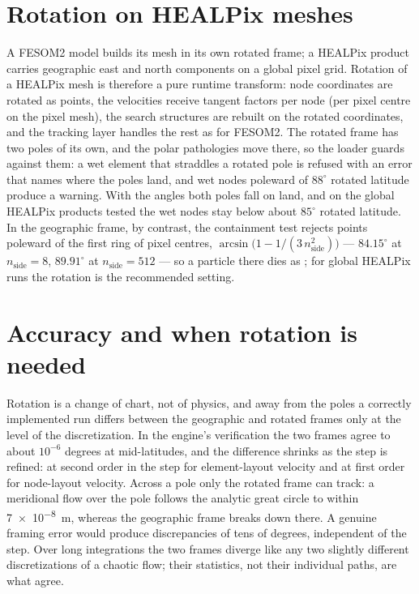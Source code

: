 \section{Rotation on HEALPix meshes}\label{sec:frame-healpix}

A FESOM2 model builds its mesh in its own rotated frame; a HEALPix product carries geographic east and
north components on a global pixel grid. Rotation of a HEALPix mesh is therefore a pure runtime
transform: node coordinates are rotated as points, the velocities receive tangent factors per node (per pixel centre on the pixel mesh), the
search structures are rebuilt on the rotated coordinates, and the tracking layer handles the rest as for
FESOM2. The rotated frame has two poles of its own, and the polar pathologies move there, so the loader
guards against them: a wet element that straddles a rotated pole is refused with an error that names
where the poles land, and wet nodes poleward of $88^\circ$ rotated latitude produce a warning. With the
 angles both poles fall on land, and on the global HEALPix products tested the wet nodes stay
below about $85^\circ$ rotated latitude. In the geographic frame, by contrast, the containment test rejects
points poleward of the first ring of pixel centres, $\arcsin\bigl(1-1/(3\,n_{\text{side}}^2)\bigr)$ ---
$84.15^\circ$ at $n_{\text{side}}=8$, $89.91^\circ$ at $n_{\text{side}}=512$ --- so a particle there dies
as ; for global HEALPix runs the rotation is the recommended setting.

\section{Accuracy and when rotation is needed}\label{sec:frame-accuracy}

Rotation is a change of chart, not of physics, and away from the poles a correctly implemented run
differs between the geographic and rotated frames only at the level of the discretization. In the
engine's verification the two frames agree to about $10^{-6}$ degrees at mid-latitudes, and the
difference shrinks as the step is refined: at second order in the step for element-layout velocity and
at first order for node-layout velocity. Across a pole only the rotated frame can track: a meridional
flow over the pole follows the analytic great circle to within \SI{7e-8}{\metre}, whereas the geographic
frame breaks down there. A genuine framing error would produce discrepancies of tens of degrees,
independent of the step. Over long integrations the two frames diverge like any two slightly different
discretizations of a chaotic flow; their statistics, not their individual paths, are what agree.

